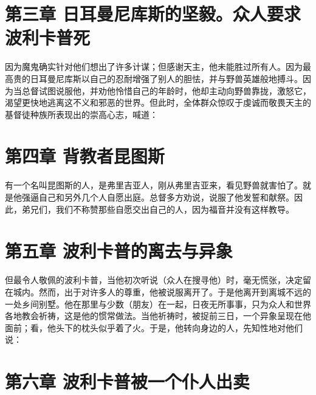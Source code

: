 
\section{第三章 日耳曼尼库斯的坚毅。众人要求波利卡普死}

因为魔鬼确实针对他们想出了许多计谋；但感谢天主，他未能胜过所有人。因为最高贵的日耳曼尼库斯以自己的忍耐增强了别人的胆怯，并与野兽英雄般地搏斗。因为当总督试图说服他，并劝他怜惜自己的年龄时，他却主动向野兽靠拢，激怒它，渴望更快地逃离这不义和邪恶的世界。但此时，全体群众惊叹于虔诚而敬畏天主的基督徒种族所表现出的崇高心志，喊道：\par


\section{第四章 背教者昆图斯}

有一个名叫昆图斯的人，是弗里吉亚人，刚从弗里吉亚来，看见野兽就害怕了。就是他强逼自己和另外几个人自愿出庭。总督多方劝说，说服了他发誓和献祭。因此，弟兄们，我们不称赞那些自愿交出自己的人，因为福音并没有这样教导。\par


\section{第五章 波利卡普的离去与异象}

但最令人敬佩的波利卡普，当他初次听说（众人在搜寻他）时，毫无慌张，决定留在城内。然而，出于对许多人的尊重，他被说服离开了。于是他离开到离城不远的一处乡间别墅。他在那里与少数（朋友）在一起，日夜无所事事，只为众人和世界各地教会祈祷，这是他的惯常做法。当他祈祷时，被捉前三日，一个异象呈现在他面前；看，他头下的枕头似乎着了火。于是，他转向身边的人，先知性地对他们说：\par


\section{第六章 波利卡普被一个仆人出卖}

